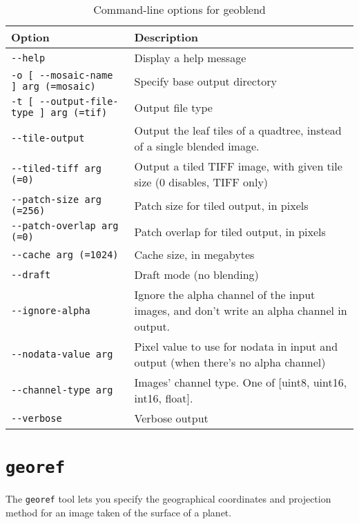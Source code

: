 \begin{longtable}{|l|p{9cm}|} 
\caption{Command-line options for geoblend}
\label{tbl:geoblend}
\endfirsthead
\endhead
\endfoot
\endlastfoot
\hline
Option & Description \\ \hline \hline
\verb#--help# & Display a help message \\ \hline
\verb#-o [ --mosaic-name ] arg (=mosaic)# & Specify base output directory\\ \hline
\verb#-t [ --output-file-type ] arg (=tif)# & Output file type\\ \hline
\verb#--tile-output# & Output the leaf tiles of a quadtree, instead of a single blended image.\\ \hline
\verb#--tiled-tiff arg (=0)# & Output a tiled TIFF image, with given tile size (0 disables, TIFF only)\\ \hline
\verb#--patch-size arg (=256)# & Patch size for tiled output, in pixels\\ \hline
\verb#--patch-overlap arg (=0)# & Patch overlap for tiled output, in pixels\\ \hline
\verb#--cache arg (=1024)# & Cache size, in megabytes\\ \hline
\verb#--draft# & Draft mode (no blending)\\ \hline
\verb#--ignore-alpha# & Ignore the alpha channel of the input images, and don't write an alpha channel in output.\\ \hline
\verb#--nodata-value arg# & Pixel value to use for nodata in input and output (when there's no alpha channel)\\ \hline
\verb#--channel-type arg# & Images' channel type. One of [uint8, uint16, int16, float].\\ \hline
\verb#--verbose# & Verbose output\\ \hline
\end{longtable}


\section{{\tt georef}}\label{sec:georef}

The \verb#georef# tool lets you specify the geographical coordinates and projection method for an image taken of the surface of a planet. 

